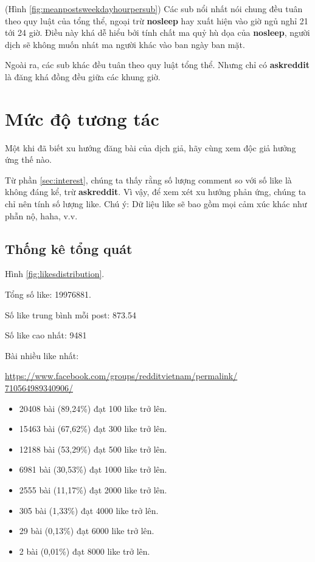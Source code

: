 \documentclass[10pt,a4paper]{article}
\begin{document}
(Hình \eqref{fig:meanpostsweekdayhourpersub}) Các sub nổi nhất nói chung đều tuân theo quy luật của tổng thể, ngoại trừ \textbf{nosleep} hay xuất hiện vào giờ ngủ nghỉ 21 tới 24 giờ. Điều này khá dễ hiểu bởi tính chất ma quỷ hù dọa của \textbf{nosleep}, người dịch sẽ không muốn nhát ma người khác vào ban ngày ban mặt.

Ngoài ra, các sub khác đều tuân theo quy luật tổng thể. Nhưng chỉ có \textbf{askreddit} là đăng khá đồng đều giữa các khung giờ.

\section{Mức độ tương tác}
Một khi đã biết xu hướng đăng bài của dịch giả, hãy cùng xem độc giả hưởng ứng thế nào.

Từ phần \eqref{sec:interest}, chúng ta thấy rằng số lượng comment so với số like là không đáng kể, trừ \textbf{askreddit}. Vì vậy, để xem xét xu hướng phản ứng, chúng ta chỉ nên tính số lượng like. Chú ý: Dữ liệu like sẽ bao gồm mọi cảm xúc khác như phẫn nộ, haha, v.v.

\subsection{Thống kê tổng quát}
Hình \eqref{fig:likesdistribution}.

Tổng số like: 19976881.

Số like trung bình mỗi post: 873.54

Số like cao nhất: 9481

Bài nhiều like nhất: 

\href{https://www.facebook.com/groups/redditvietnam/permalink/710564989340906/}{https://www.facebook.com/groups/redditvietnam/permalink/\\710564989340906/}

\begin{itemize}
    \item 20408 bài (89,24\%) đạt 100 like trở lên.
    \item 15463 bài (67,62\%) đạt 300 like trở lên.
    \item 12188 bài (53,29\%) đạt 500 like trở lên.
    \item 6981 bài (30,53\%) đạt 1000 like trở lên.
    \item 2555 bài (11,17\%) đạt 2000 like trở lên.
    \item 305 bài (1,33\%) đạt 4000 like trở lên.
    \item 29 bài (0,13\%) đạt 6000 like trở lên.
    \item 2 bài (0,01\%) đạt 8000 like trở lên.
\end{itemize}
\end{document}

